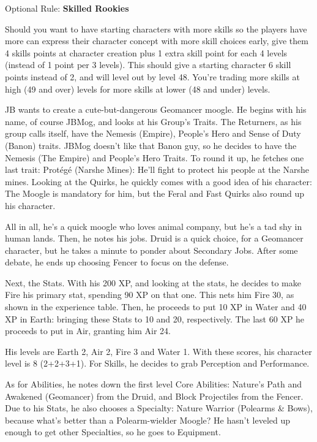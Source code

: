 \begin{multicols}{2}
\begin{enumerate}
\end{enumerate}
\begin{boco}
Optional Rule: \textbf{Skilled Rookies}

Should you want to have starting characters with more skills so the players have more can express their character concept with more skill choices early, give them 4 skills points at character creation plus 1 extra skill point for each 4 levels (instead of 1 point per 3 levels). This should give a starting character 6 skill points instead of 2, and will level out by level 48. You're trading more skills at high (49 and over) levels for more skills at lower (48 and under) levels.

\end{boco}
\end{multicols}

\begin{multimog}
JB wants to create a cute-but-dangerous Geomancer moogle. He begins with his name, of course JBMog, and looks at his Group's Traits. The Returners, as his group calls itself, have the Nemesis (Empire), People's Hero and Sense of Duty (Banon) traits. JBMog doesn't like that Banon guy, so he decides to have the Nemesis (The Empire) and People's Hero Traits. To round it up, he fetches one last trait: Prot\'eg\'e (Narshe Mines): He'll fight to protect his people at the Narshe mines. Looking at the Quirks, he quickly comes with a good idea of his character: The Moogle is mandatory for him, but the Feral and Fast Quirks also round up his character.

All in all, he's a quick moogle who loves animal company, but he's a tad shy in human lands. Then, he notes his jobs. Druid is a quick choice, for a Geomancer character, but he takes a minute to ponder about Secondary Jobs. After some debate, he ends up choosing Fencer to focus on the defense.

Next, the Stats. With his 200 XP, and looking at the stats, he decides to make Fire his primary stat, spending 90 XP on that one. This nets him Fire 30, as shown in the experience table. Then, he proceeds to put 10 XP in Water and 40 XP in Earth: bringing these Stats to 10 and 20, respectively. The last 60 XP he proceeds to put in Air, granting him Air 24.

His levels are Earth 2, Air 2, Fire 3 and Water 1. With these scores, his character level is 8 (2+2+3+1). For Skills, he decides to grab Perception and Performance.

As for Abilities, he notes down the first level Core Abilities: Nature's Path and Awakened (Geomancer) from the Druid, and Block Projectiles from the Fencer. Due to his Stats, he also chooses a Specialty: Nature Warrior (Polearms \& Bows), because what’s better than a Polearm-wielder Moogle? He hasn't leveled up enough to get other Specialties, so he goes to Equipment.


\end{multimog}
